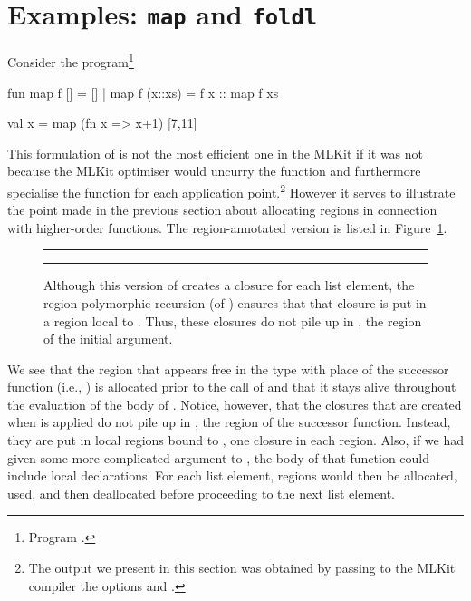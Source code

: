 \documentclass[12pt]{book}
\begin{document}
\section{Examples: \texttt{map} and \texttt{foldl}}
Consider the program\footnote{Program .}
\begin{smlcode}
  fun map f [] = []
    | map f (x::xs) = f x :: map f xs

  val x = map (fn x => x+1) [7,11]
\end{smlcode}
This formulation of  is not the most efficient one in the MLKit if it
was not because the MLKit optimiser would uncurry the function and furthermore
specialise the function for each application point.\footnote{The output we
present in this section was obtained by passing to the MLKit compiler the
options  and .} However
it serves to illustrate the point made in the previous section about allocating
regions in connection with higher-order functions. The region-annotated version
is listed in Figure~\ref{map.fig}.
\begin{figure}
\hrule \medskip
{}
\caption{Although this version of  creates a closure for each list
  element, the region-polymorphic recursion (of ) ensures that that
  closure is put in a region local to .  Thus, these closures do not
  pile up in , the region of the initial argument.}
\medskip \hrule
\label{map.fig}
\end{figure}
We see that the region that appears free in the type with place of the successor
function (i.e., ) is allocated prior to the call of  and that
it stays alive throughout the evaluation of the body of . Notice,
however, that the closures that are created when  is applied do not pile
up in , the region of the successor function. Instead, they are put in
local regions bound to , one closure in each region.  Also, if we had
given some more complicated argument to , the body of that function
could include local  declarations. For each list element, regions
would then be allocated, used, and then deallocated before proceeding to the
next list element.
\end{document}

